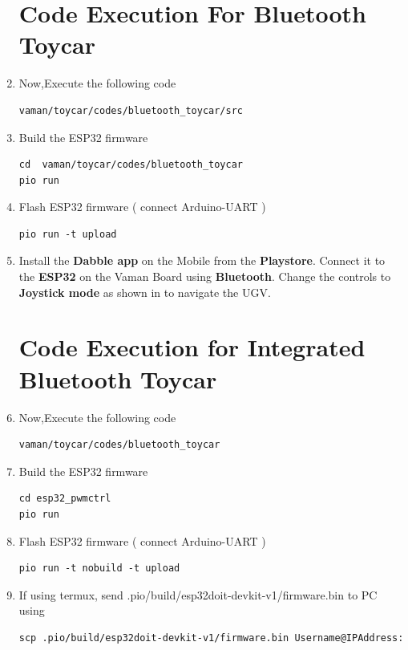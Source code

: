 \begin{enumerate}[label=\thesection.\arabic*.,ref=\thesection.\theenumi]
\section{Code Execution For Bluetooth Toycar}
\raggedright

\item Now,Execute the following code
\begin{lstlisting}
vaman/toycar/codes/bluetooth_toycar/src
\end{lstlisting}

\item Build the ESP32 firmware
\begin{lstlisting}
cd  vaman/toycar/codes/bluetooth_toycar
pio run
\end{lstlisting} 

\item Flash ESP32 firmware ( connect Arduino-UART  )
\begin{lstlisting}
pio run -t upload
\end{lstlisting} 
\item Install the \textbf{Dabble app} on the Mobile from the \textbf{Playstore}. Connect it to the \textbf{ESP32} on the Vaman Board using \textbf{Bluetooth}. Change the controls to \textbf{Joystick mode} as shown in to navigate the UGV.\\

\section{Code Execution for Integrated Bluetooth Toycar}
\raggedright
\item Now,Execute the following code 

\begin{lstlisting}
vaman/toycar/codes/bluetooth_toycar
\end{lstlisting}

\item Build the ESP32 firmware
\begin{lstlisting}
cd esp32_pwmctrl
pio run
\end{lstlisting} 

\item Flash ESP32 firmware ( connect Arduino-UART  )
\begin{lstlisting}
pio run -t nobuild -t upload
\end{lstlisting} 

\item If using termux, send .pio/build/esp32doit-devkit-v1/firmware.bin to PC using
\begin{lstlisting}
scp .pio/build/esp32doit-devkit-v1/firmware.bin Username@IPAddress:
\end{lstlisting} 


\end{enumerate}
